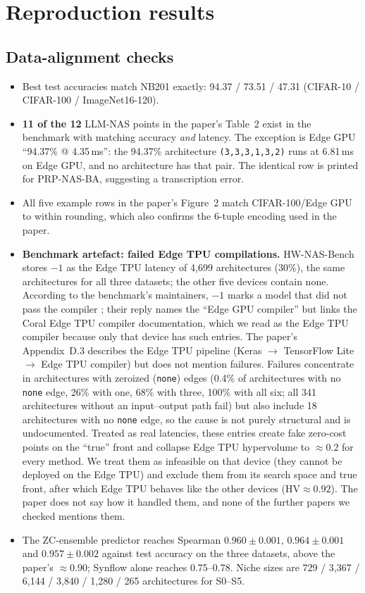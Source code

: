 \documentclass[11pt,a4paper]{article}
\newcommand{\code}[1]{\texttt{#1}}
\newcommand{\HV}{\mathrm{HV}}
\begin{document}
\section{Reproduction results}\label{sec:cnnresults}

\subsection{Data-alignment checks}
\begin{itemize}[nosep]
  \item Best test accuracies match NB201 exactly: 94.37 / 73.51 / 47.31 (CIFAR-10 / CIFAR-100 / ImageNet16-120).
  \item \textbf{11 of the 12} LLM-NAS points in the paper's Table~2 exist in the benchmark with matching accuracy \emph{and} latency. The exception is Edge GPU ``94.37\% @ 4.35\,ms'': the 94.37\% architecture \code{(3,3,3,1,3,2)} runs at 6.81\,ms on Edge GPU, and no architecture has that pair. The identical row is printed for PRP-NAS-BA, suggesting a transcription error.
  \item All five example rows in the paper's Figure~2 match CIFAR-100/Edge GPU to within rounding, which also confirms the 6-tuple encoding used in the paper.
  \item \textbf{Benchmark artefact: failed Edge TPU compilations.} HW-NAS-Bench stores $-1$ as the Edge TPU latency of 4{,}699 architectures (30\%), the same architectures for all three datasets; the other five devices contain none. According to the benchmark's maintainers, $-1$ marks a model that did not pass the compiler \cite{hwnasissue}; their reply names the ``Edge GPU compiler'' but links the Coral Edge TPU compiler documentation, which we read as the Edge TPU compiler because only that device has such entries. The paper's Appendix~D.3 describes the Edge TPU pipeline (Keras $\to$ TensorFlow Lite $\to$ Edge TPU compiler) but does not mention failures. Failures concentrate in architectures with zeroized (\code{none}) edges (0.4\% of architectures with no \code{none} edge, 26\% with one, 68\% with three, 100\% with all six; all 341 architectures without an input--output path fail) but also include 18 architectures with no \code{none} edge, so the cause is not purely structural and is undocumented. Treated as real latencies, these entries create fake zero-cost points on the ``true'' front and collapse Edge TPU hypervolume to $\approx0.2$ for every method. We treat them as infeasible on that device (they cannot be deployed on the Edge TPU) and exclude them from its search space and true front, after which Edge TPU behaves like the other devices ($\HV\approx0.92$). The paper does not say how it handled them, and none of the further papers we checked mentions them.
  \item The ZC-ensemble predictor reaches Spearman $0.960\pm0.001$, $0.964\pm0.001$ and $0.957\pm0.002$ against test accuracy on the three datasets, above the paper's $\approx0.90$; Synflow alone reaches 0.75--0.78. Niche sizes are 729 / 3{,}367 / 6{,}144 / 3{,}840 / 1{,}280 / 265 architectures for S0--S5.
\end{itemize}
\end{document}
